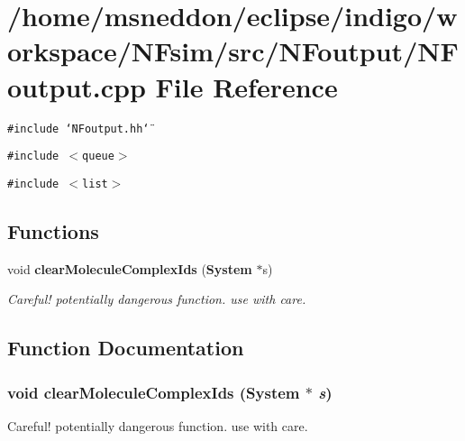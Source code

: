 \section{/home/msneddon/eclipse/indigo/workspace/NFsim/src/NFoutput/NFoutput.cpp File Reference}
\label{NFoutput_8cpp}


{\tt \#include \char`\"{}NFoutput.hh\char`\"{}}\par
{\tt \#include $<$queue$>$}\par
{\tt \#include $<$list$>$}\par
\subsection*{Functions}
\begin{CompactItemize}
\item 
void {\bf clearMoleculeComplexIds} ({\bf System} $\ast$s)
\begin{CompactList}\small\item\em Careful! potentially dangerous function. use with care. \item\end{CompactList}\end{CompactItemize}


\subsection{Function Documentation}
\subsubsection{\setlength{\rightskip}{0pt plus 5cm}void clearMoleculeComplexIds ({\bf System} $\ast$ {\em s})}\label{NFoutput_8cpp_1cd504a5c6f14f0979fe75d3e2a24928}


Careful! potentially dangerous function. use with care. 

